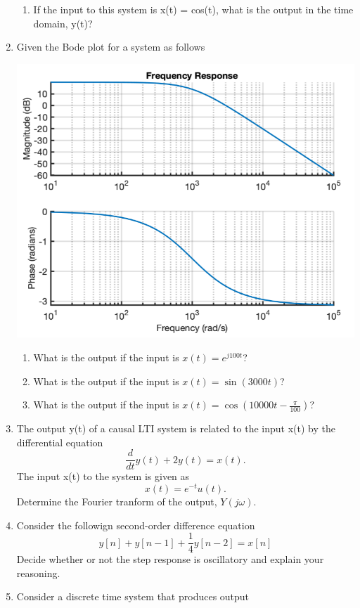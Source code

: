 \documentclass{article}
\begin{document}
\begin{enumerate}
\begin{enumerate}
        \item If the input to this system is x(t) = cos(t), what is the output in the time domain, y(t)?
    \end{enumerate}
    \newpage
    \item Given the Bode plot for a system as follows
    \begin{center}
        \includegraphics[width = .5\textwidth]{bode.png}
    \end{center}
    \begin{enumerate}
        \item What is the output if the input is $x(t) = e^{j100t}$?
        \item What is the output if the input is $x(t) = \sin(3000t)$?
        \item What is the output if the input is $x(t) = \cos(10000t - \frac{\pi}{100})$?
    \end{enumerate}
    \newpage
    \item The output y(t) of a causal LTI system is related to the input x(t) by the differential equation   
    \begin{equation}
        \frac{d}{dt}y(t) + 2y(t) = x(t).
    \end{equation}
    The input x(t) to the system is given as
    \begin{equation}
        x(t) = e^{-t}u(t).
    \end{equation}
    Determine the Fourier tranform of the output, $Y(j\omega)$.
    \newpage
    \item Consider the followign second-order  difference equation
    \begin{equation}
        y[n] + y[n-1] +\frac{1}{4}y[n-2] = x[n]
    \end{equation}
    Decide whether or not the step response is oscillatory and explain your reasoning.
    \newpage
    \item Consider a discrete time system that produces output
    \begin{equation}

\end{equation}
\end{enumerate}
\end{document}
